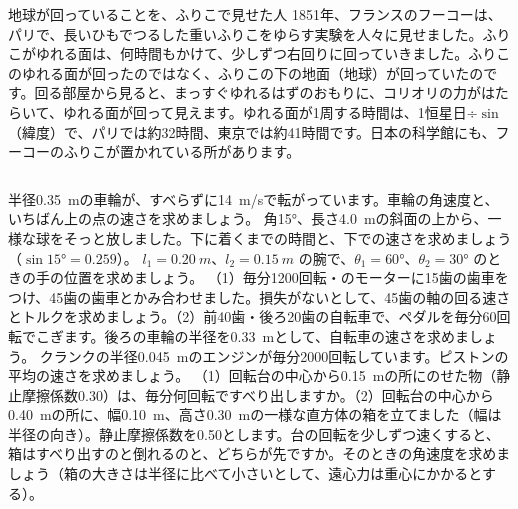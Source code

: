 \begin{column}{地球が回っていることを、ふりこで見せた人}
1851年、フランスのフーコーは、パリで、長いひもでつるした重いふりこをゆらす実験を人々に見せました。ふりこがゆれる面は、何時間もかけて、少しずつ右回りに回っていきました。ふりこのゆれる面が回ったのではなく、ふりこの下の地面（地球）が回っていたのです。回る部屋から見ると、まっすぐゆれるはずのおもりに、コリオリの力がはたらいて、ゆれる面が回って見えます。ゆれる面が1周する時間は、1恒星日÷$\sin$（緯度）で、パリでは約32時間、東京では約41時間です。日本の科学館にも、フーコーのふりこが置かれている所があります。
\end{column}

\bkendproblems
{}
\bkproblem 半径\qty{0.35}{m}の車輪が、すべらずに\qty{14}{m/s}で転がっています。車輪の角速度と、いちばん上の点の速さを求めましょう。
\bkproblem 角\ang{15}、長さ\qty{4.0}{m}の斜面の上から、一様な球をそっと放しました。下に着くまでの時間と、下での速さを求めましょう（$\sin\ang{15}=0.259$）。
\bkproblem $l_1=\qty{0.20}{m}$、$l_2=\qty{0.15}{m}$ の腕で、$\theta_1=\ang{60}$、$\theta_2=\ang{30}$ のときの手の位置を求めましょう。
\bkproblem （1）毎分1200回転・のモーターに15歯の歯車をつけ、45歯の歯車とかみ合わせました。損失がないとして、45歯の軸の回る速さとトルクを求めましょう。（2）前40歯・後ろ20歯の自転車で、ペダルを毎分60回転でこぎます。後ろの車輪の半径を\qty{0.33}{m}として、自転車の速さを求めましょう。
\bkproblem クランクの半径\qty{0.045}{m}のエンジンが毎分2000回転しています。ピストンの平均の速さを求めましょう。
\bkproblem （1）回転台の中心から\qty{0.15}{m}の所にのせた物（静止摩擦係数0.30）は、毎分何回転ですべり出しますか。（2）回転台の中心から\qty{0.40}{m}の所に、幅\qty{0.10}{m}、高さ\qty{0.30}{m}の一様な直方体の箱を立てました（幅は半径の向き）。静止摩擦係数を0.50とします。台の回転を少しずつ速くすると、箱はすべり出すのと倒れるのと、どちらが先ですか。そのときの角速度を求めましょう（箱の大きさは半径に比べて小さいとして、遠心力は重心にかかるとする）。
